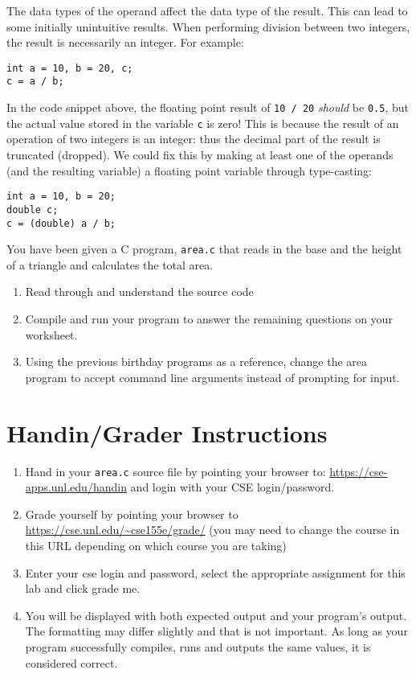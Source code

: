 \documentclass[12pt]{scrartcl}
\begin{document}
The data types of the operand affect the data type of the result.  This 
can lead to some initially unintuitive results.  When performing division 
between two integers, the result is necessarily an integer.  For example:

\begin{verbatim}
int a = 10, b = 20, c;
c = a / b;
\end{verbatim}

In the code snippet above, the floating point result of \texttt{10 / 20} 
\emph{should} be \texttt{0.5}, but the actual value stored in the 
variable \texttt{c} is zero!  This is because the result of an operation 
of two integers is an integer: thus the decimal part of the result is truncated 
(dropped).  We could fix this by making at least one of the operands (and 
the resulting variable) a floating point variable through type-casting:

\begin{verbatim}
int a = 10, b = 20;
double c;
c = (double) a / b;
\end{verbatim}

You have been given a C program, \texttt{area.c} that reads 
in the base and the height of a triangle and calculates the total area.

\begin{enumerate}
  \item Read through and understand the source code
  \item Compile and run your program to answer the remaining questions 
  	on your worksheet.
  \item Using the previous birthday programs as a reference, change the
  	area program to accept command line arguments instead of prompting
	for input.
\end{enumerate}  

\section{Handin/Grader Instructions}

\begin{enumerate}
  \item Hand in your \texttt{area.c} source file by pointing your browser to:
  	\url{https://cse-apps.unl.edu/handin} and login with your CSE 
	login/password.
  \item Grade yourself by pointing your browser to 
  	\url{https://cse.unl.edu/~cse155e/grade/} (you may need to change the course
	in this URL depending on which course you are taking)
  \item Enter your cse login and password, select the appropriate assignment for 
  	this lab and click grade me.
  \item You will be displayed with both expected output and your program's output.  
	The formatting may differ slightly and that is not important.  As long as your 
	program successfully compiles, runs and outputs the same values, it is considered 
	correct.
\end{enumerate}  
\end{document}
